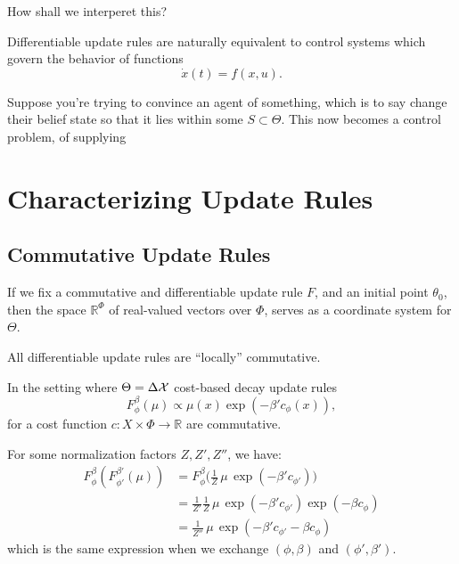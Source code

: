 \documentclass{article}
\begin{document}
How shall we interperet this?


\begin{prop}
    Differentiable update rules are naturally equivalent to control systems
    which govern the behavior of functions
    \[
        \dot x(t) = f(x, u).
    \]
\end{prop}


Suppose you're trying to convince an agent of something, which is to say change their belief state so that it lies within some $S \subset \Theta$.
This now becomes a control problem, of supplying


\section{Characterizing Update Rules}

\subsection{Commutative Update Rules}

If we fix a commutative and differentiable update rule $F$, and an initial point $\theta_0$, then the space $\mathbb R^\Phi$ of real-valued vectors over $\Phi$,
serves as a coordinate system for $\Theta$.


\begin{prop}
\end{prop}


\begin{prop}
    All differentiable update rules are ``locally'' commutative.
\end{prop}

\begin{prop}
    In the setting where $\Theta = \Delta\mathcal X$
    cost-based decay update rules
    \[
        F^{\beta}_\phi(\mu) \propto \mu(x) \exp(- \beta' c_{\phi}(x)),
    \]
    for a cost function $c : X \times \Phi \to \mathbb R$
    are commutative.
\end{prop}
\begin{lproof}
    For some normalization factors $Z, Z', Z''$, we have:
    \begin{align*}
         F^\beta_\phi( F^{\beta'}_{\phi'}(\mu))
         &= F^\beta_\phi \Big( \frac{1}{Z} \,\mu\, \exp(- \beta' c_{\phi'}) \Big) \\
         &= \frac{1}{Z'} \frac{1}{Z} \,\mu\, \exp(- \beta' c_{\phi'}) \exp(- \beta c_{\phi}) \\
         &= \frac{1}{Z''} \,\mu\, \exp(-\beta' c_{\phi'} - \beta c_\phi)
    \end{align*}
    which is the same expression when we exchange $(\phi, \beta)$ and $(\phi', \beta')$.
\end{lproof}
\end{document}
